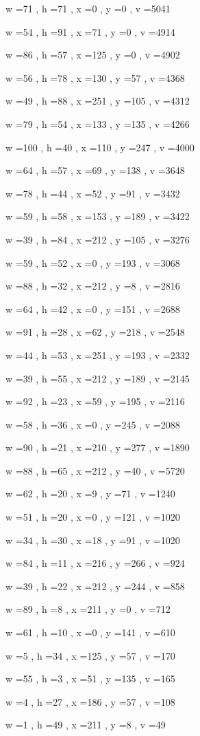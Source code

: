 \documentclass[11pt]{article}
\begin{document}
w =71 , h =71 , x =0 , y =0 , v =5041
\par
w =54 , h =91 , x =71 , y =0 , v =4914
\par
w =86 , h =57 , x =125 , y =0 , v =4902
\par
w =56 , h =78 , x =130 , y =57 , v =4368
\par
w =49 , h =88 , x =251 , y =105 , v =4312
\par
w =79 , h =54 , x =133 , y =135 , v =4266
\par
w =100 , h =40 , x =110 , y =247 , v =4000
\par
w =64 , h =57 , x =69 , y =138 , v =3648
\par
w =78 , h =44 , x =52 , y =91 , v =3432
\par
w =59 , h =58 , x =153 , y =189 , v =3422
\par
w =39 , h =84 , x =212 , y =105 , v =3276
\par
w =59 , h =52 , x =0 , y =193 , v =3068
\par
w =88 , h =32 , x =212 , y =8 , v =2816
\par
w =64 , h =42 , x =0 , y =151 , v =2688
\par
w =91 , h =28 , x =62 , y =218 , v =2548
\par
w =44 , h =53 , x =251 , y =193 , v =2332
\par
w =39 , h =55 , x =212 , y =189 , v =2145
\par
w =92 , h =23 , x =59 , y =195 , v =2116
\par
w =58 , h =36 , x =0 , y =245 , v =2088
\par
w =90 , h =21 , x =210 , y =277 , v =1890
\par
w =88 , h =65 , x =212 , y =40 , v =5720
\par
w =62 , h =20 , x =9 , y =71 , v =1240
\par
w =51 , h =20 , x =0 , y =121 , v =1020
\par
w =34 , h =30 , x =18 , y =91 , v =1020
\par
w =84 , h =11 , x =216 , y =266 , v =924
\par
w =39 , h =22 , x =212 , y =244 , v =858
\par
w =89 , h =8 , x =211 , y =0 , v =712
\par
w =61 , h =10 , x =0 , y =141 , v =610
\par
w =5 , h =34 , x =125 , y =57 , v =170
\par
w =55 , h =3 , x =51 , y =135 , v =165
\par
w =4 , h =27 , x =186 , y =57 , v =108
\par
w =1 , h =49 , x =211 , y =8 , v =49
\par
\newpage
\end{document}
